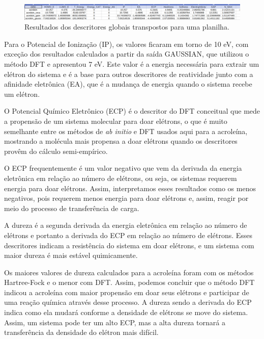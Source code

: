 \documentclass[a4paper,11pt]{refart}
\begin{document}
\hspace*{-1.2\leftmarginwidth}
\begin{minipage}{\fullwidth}
	\begin{figure}[H]
		\begin{center}
			\includegraphics[width=7in]{images/img4}
			\caption{Resultados dos descritores globais transpostos para uma planilha.}
			\label{fig_tut1_3}
		\end{center}
	\end{figure}
\end{minipage}	

Para o Potencial de Ionização (IP), os valores ficaram em torno de 10 eV, com exceção dos resultados calculados a partir da saída GAUSSIAN, que utilizou o método DFT e apresentou 7 eV. Este valor é a energia necessária para extrair um elétron do sistema e é a base para outros descritores de reatividade junto com a afinidade eletrônica (EA), que é a mudança de energia quando o sistema recebe um elétron. 

O Potencial Químico Eletrônico (ECP) é o descritor do DFT conceitual que mede a propensão de um sistema molecular para doar elétrons, o que é muito semelhante entre os métodos de \textit{ab initio} e DFT usados aqui para a acroleína, mostrando a molécula mais propensa a doar elétrons quando os descritores provêm do cálculo semi-empírico.

O ECP frequentemente é um valor negativo que vem da derivada da energia eletrônica em relação ao número de elétrons, ou seja, os sistemas requerem energia para doar elétrons. Assim, interpretamos esses resultados como os menos negativos, pois requerem menos energia para doar elétrons e, assim, reagir por meio do processo de transferência de carga.

A dureza é a segunda derivada da energia eletrônica em relação ao número de elétrons e portanto a derivada do ECP em relação ao número de elétrons. Esses descritores indicam a resistência do sistema em doar elétrons, e um sistema com maior dureza é mais estável quimicamente. 

Os maiores valores de dureza calculados para a acroleína foram com os métodos Hartree-Fock e o menor com DFT. Assim, podemos concluir que o método DFT indicou a acroleína com maior propensão em doar seus elétrons e participar de uma reação química através desse processo. A dureza sendo a derivada do ECP indica como ela mudará conforme a densidade de elétrons se move do sistema. Assim, um sistema pode ter um alto ECP, mas a alta dureza tornará a transferência da densidade do elétron mais difícil.
\end{document}
